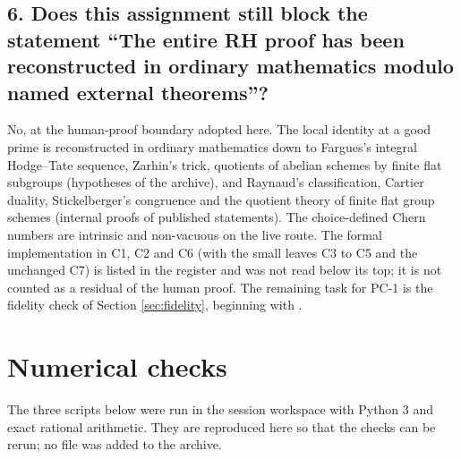 \documentclass[11pt]{article}
\theoremstyle{remark}
\begin{document}
\subsection*{6. Does this assignment still block the statement ``The entire RH proof has been reconstructed in ordinary mathematics modulo named external theorems''?}
No, at the human-proof boundary adopted here. The local identity at a good prime is reconstructed in ordinary mathematics down to Fargues's integral Hodge--Tate sequence, Zarhin's trick, quotients of abelian schemes by finite flat subgroups (hypotheses of the archive), and Raynaud's classification, Cartier duality, Stickelberger's congruence and the quotient theory of finite flat group schemes (internal proofs of published statements). The choice-defined Chern numbers are intrinsic and non-vacuous on the live route. The formal implementation in C1, C2 and C6 (with the small leaves C3 to C5 and the unchanged C7) is listed in the register and was not read below its top; it is not counted as a residual of the human proof. The remaining task for PC-1 is the fidelity check of Section \ref{sec:fidelity}, beginning with .

\appendix
\section{Numerical checks}\label{app:checks}
The three scripts below were run in the session workspace with Python 3 and exact rational arithmetic. They are reproduced here so that the checks can be rerun; no file was added to the archive.
\end{document}
